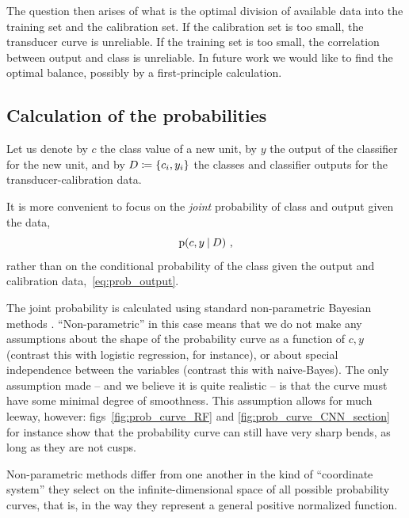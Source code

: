 \documentclass[a4paper,12pt,%
onecolumn,oneside,article,%
british%
]{memoir}
\newcommand*{\defd}{\coloneqq}
\DeclarePairedDelimiter\set{\{}{\}} %
\newcommand*{\p}{\mathrm{p}}%
\renewcommand*{\|}[1][]{\nonscript\:#1\vert\nonscript\:\mathopen{}}
\newcommand*{\figs}{figs}%
\newcommand*{\eg}{{e.g.}}
\begin{document}
The question then arises of what is the optimal division of available data into the training set and the calibration set. If the calibration set is too small, the transducer curve is unreliable. If the training set is too small, the correlation between output and class is unreliable. In future work we would like to find the optimal balance, possibly by a first-principle calculation.



\subsection{Calculation of the probabilities}
\label{sec:calculation_transducer}

Let us denote by $c$ the class value of a new unit, by $y$ the output of the classifier for the new unit, and by $D \defd \set{c_{i}, y_{i}}$ the classes and classifier outputs for the transducer-calibration data.

It is more convenient to focus on the \emph{joint} probability of class and output given the data,
\begin{equation}
  \label{eq:prob_output}
  \p(c, y \| D) \ ,
\end{equation}
rather than on the conditional probability of the class given the output and calibration data,~\eqref{eq:prob_output}.

The joint probability is calculated using standard non-parametric Bayesian methods \autocites[for introductions and reviews see \eg][]{walker2013,muelleretal2004b,hjort1996}. \enquote{Non-parametric} in this case means that we do not make any assumptions about the shape of the probability curve as a function of $c,y$ (contrast this with logistic regression, for instance), or about special independence between the variables (contrast this with naive-Bayes). The only assumption made -- and we believe it is quite realistic -- is that the curve must have some minimal degree of smoothness. This assumption allows for much leeway, however: \figs~\ref{fig:prob_curve_RF} and \ref{fig:prob_curve_CNN_section} for instance show that the probability curve can still have very sharp bends, as long as they are not cusps.

Non-parametric methods differ from one another in the kind of \enquote{coordinate system} they select on the infinite-dimensional space of all possible probability curves, that is, in the way they represent a general positive normalized function.
\end{document}
